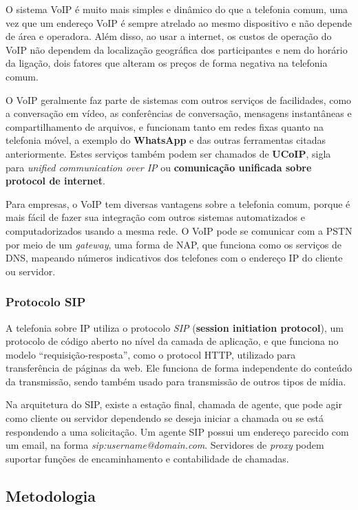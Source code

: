 \documentclass[12pt]{article}
\begin{document}
O sistema VoIP é muito mais simples e dinâmico do que a telefonia comum, uma
vez que um endereço VoIP é sempre atrelado ao mesmo dispositivo e não depende
de área e operadora. Além disso, ao usar a internet, os custos de operação do
VoIP não dependem da localização geográfica dos participantes e nem do horário
da ligação, dois fatores que alteram os preços de forma negativa na telefonia
comum.

O VoIP geralmente faz parte de sistemas com outros serviços de facilidades,
como a conversação em vídeo, as conferências de conversação, mensagens
instantâneas e compartilhamento de arquivos, e funcionam tanto em redes fixas
quanto na telefonia móvel, a exemplo do \textbf{WhatsApp} e das outras
ferramentas citadas anteriormente. Estes serviços também podem ser chamados de
\textbf{UCoIP}, sigla para \textit{unified communication over IP} ou
\textbf{comunicação unificada sobre protocol de internet}.

Para empresas, o VoIP tem diversas vantagens sobre a telefonia comum, porque é
mais fácil de fazer sua integração com outros sistemas automatizados e
computadorizados usando a mesma rede. O VoIP pode se comunicar com a PSTN por
meio de um \textit{gateway}, uma forma de NAP, que funciona como os serviços
de DNS, mapeando números indicativos dos telefones com o endereço IP do cliente
ou servidor.

\subsubsection{Protocolo SIP}

A telefonia sobre IP utiliza o protocolo \textit{SIP}
(\textbf{session initiation protocol}), um protocolo de código aberto no nível
da camada de aplicação, e que funciona no modelo ``requisição-resposta'', como
o protocol HTTP, utilizado para transferência de páginas da web. Ele funciona
de forma independente do conteúdo da transmissão, sendo também usado para
transmissão de outros tipos de mídia.

Na arquitetura do SIP, existe a estação final, chamada de agente, que pode agir
como cliente ou servidor dependendo se deseja iniciar a chamada ou se está
respondendo a uma solicitação. Um agente SIP possui um endereço parecido com um
email, na forma \textit{sip:username@domain.com}. Servidores de \textit{proxy}
podem suportar funções de encaminhamento e contabilidade de chamadas.

\subsection{Metodologia}
\end{document}

